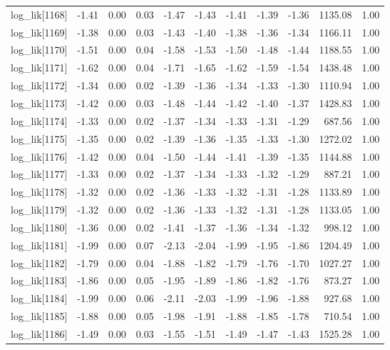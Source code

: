 \begin{table}[ht]
\begin{tabular}{rrrrrrrrrrr}
  log\_lik[1168] & -1.41 & 0.00 & 0.03 & -1.47 & -1.43 & -1.41 & -1.39 & -1.36 & 1135.08 & 1.00 \\ 
  log\_lik[1169] & -1.38 & 0.00 & 0.03 & -1.43 & -1.40 & -1.38 & -1.36 & -1.34 & 1166.11 & 1.00 \\ 
  log\_lik[1170] & -1.51 & 0.00 & 0.04 & -1.58 & -1.53 & -1.50 & -1.48 & -1.44 & 1188.55 & 1.00 \\ 
  log\_lik[1171] & -1.62 & 0.00 & 0.04 & -1.71 & -1.65 & -1.62 & -1.59 & -1.54 & 1438.48 & 1.00 \\ 
  log\_lik[1172] & -1.34 & 0.00 & 0.02 & -1.39 & -1.36 & -1.34 & -1.33 & -1.30 & 1110.94 & 1.00 \\ 
  log\_lik[1173] & -1.42 & 0.00 & 0.03 & -1.48 & -1.44 & -1.42 & -1.40 & -1.37 & 1428.83 & 1.00 \\ 
  log\_lik[1174] & -1.33 & 0.00 & 0.02 & -1.37 & -1.34 & -1.33 & -1.31 & -1.29 & 687.56 & 1.00 \\ 
  log\_lik[1175] & -1.35 & 0.00 & 0.02 & -1.39 & -1.36 & -1.35 & -1.33 & -1.30 & 1272.02 & 1.00 \\ 
  log\_lik[1176] & -1.42 & 0.00 & 0.04 & -1.50 & -1.44 & -1.41 & -1.39 & -1.35 & 1144.88 & 1.00 \\ 
  log\_lik[1177] & -1.33 & 0.00 & 0.02 & -1.37 & -1.34 & -1.33 & -1.32 & -1.29 & 887.21 & 1.00 \\ 
  log\_lik[1178] & -1.32 & 0.00 & 0.02 & -1.36 & -1.33 & -1.32 & -1.31 & -1.28 & 1133.89 & 1.00 \\ 
  log\_lik[1179] & -1.32 & 0.00 & 0.02 & -1.36 & -1.33 & -1.32 & -1.31 & -1.28 & 1133.05 & 1.00 \\ 
  log\_lik[1180] & -1.36 & 0.00 & 0.02 & -1.41 & -1.37 & -1.36 & -1.34 & -1.32 & 998.12 & 1.00 \\ 
  log\_lik[1181] & -1.99 & 0.00 & 0.07 & -2.13 & -2.04 & -1.99 & -1.95 & -1.86 & 1204.49 & 1.00 \\ 
  log\_lik[1182] & -1.79 & 0.00 & 0.04 & -1.88 & -1.82 & -1.79 & -1.76 & -1.70 & 1027.27 & 1.00 \\ 
  log\_lik[1183] & -1.86 & 0.00 & 0.05 & -1.95 & -1.89 & -1.86 & -1.82 & -1.76 & 873.27 & 1.00 \\ 
  log\_lik[1184] & -1.99 & 0.00 & 0.06 & -2.11 & -2.03 & -1.99 & -1.96 & -1.88 & 927.68 & 1.00 \\ 
  log\_lik[1185] & -1.88 & 0.00 & 0.05 & -1.98 & -1.91 & -1.88 & -1.85 & -1.78 & 710.54 & 1.00 \\ 
  log\_lik[1186] & -1.49 & 0.00 & 0.03 & -1.55 & -1.51 & -1.49 & -1.47 & -1.43 & 1525.28 & 1.00 \\ 

\end{tabular}
\end{table}
